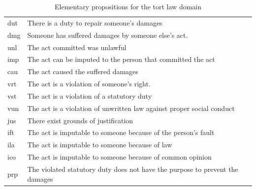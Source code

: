 \documentclass{IOS-Book-Article}
\begin{document}
\footnotesize
\begin{table}[htb]
\caption{Elementary propositions for the tort law domain}
\centering
\begin{tabularx}{120mm}{>{\hsize=0.1\hsize}X>{\hsize=1.6\hsize}X}
\hline
dut	&	There is a duty to repair someone's damages\\
dmg	&	Someone has suffered damages by someone else's act.\\
unl	&	The act committed was unlawful\\
imp	&	The act can be imputed to the person that committed the act\\
cau	&	The act caused the suffered damages\\
vrt	&	The act is a violation of someone’s right.\\
vst	&	The act is a violation of a statutory duty\\
vun	&	The act is a violation of unwritten law against proper social conduct\\
jus	&	There exist grounds of justification\\
ift	&	The act is imputable to someone because of the person's fault\\
ila	&	The act is imputable to someone because of law\\
ico	&	The act is imputable to someone because of common opinion\\
prp	&	The violated statutory duty does not have the purpose to prevent the damages\\ \hline
\end{tabularx}
\end{table}
\normalsize
\end{document}
